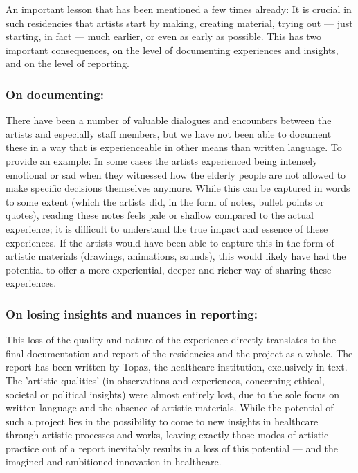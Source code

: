 \documentclass[authordate, empirical]{jote-new-article}
\begin{document}
	An important lesson that has been mentioned a few times already: It is crucial in such residencies that artists start by making, creating material, trying out --- just starting, in fact --- much earlier, or even as early as possible. This has two important consequences, on the level of documenting experiences and insights, and on the level of reporting.







	\subsubsection{On documenting:}







	There have been a number of valuable dialogues and encounters between the artists and especially staff members, but we have not been able to document these in a way that is experienceable in other means than written language. To provide an example: In some cases the artists experienced being intensely emotional or sad when they witnessed how the elderly people are not allowed to make specific decisions themselves anymore. While this can be captured in words to some extent (which the artists did, in the form of notes, bullet points or quotes), reading these notes feels pale or shallow compared to the actual experience; it is difficult to understand the true impact and essence of these experiences. If the artists would have been able to capture this in the form of artistic materials (drawings, animations, sounds), this would likely have had the potential to offer a more experiential, deeper and richer way of sharing these experiences.







	\subsubsection{On losing insights and nuances in reporting:}







	This loss of the quality and nature of the experience directly translates to the final documentation and report of the residencies and the project as a whole. The report has been written by Topaz, the healthcare institution, exclusively in text. The 'artistic qualities' (in observations and experiences, concerning ethical, societal or political insights) were almost entirely lost, due to the sole focus on written language and the absence of artistic materials. While the potential of such a project lies in the possibility to come to new insights in healthcare through artistic processes and works, leaving exactly those modes of artistic practice out of a report inevitably results in a loss of this potential — and the imagined and ambitioned innovation in healthcare.
\end{document}
